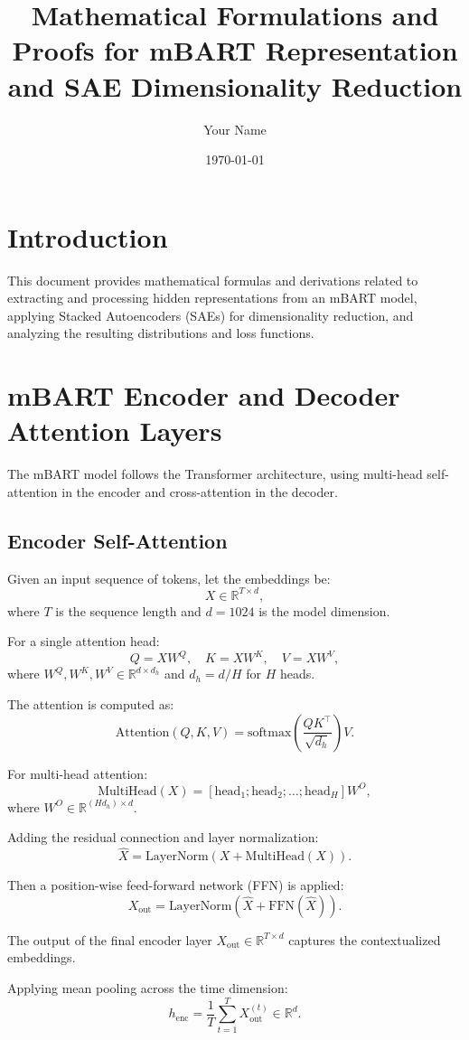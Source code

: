 \documentclass[11pt,a4paper]{article}
\title{Mathematical Formulations and Proofs for mBART Representation and SAE Dimensionality Reduction}
\author{Your Name}
\date{\today}
\begin{document}
\maketitle

\section{Introduction}
This document provides mathematical formulas and derivations related to extracting and processing hidden representations from an mBART model, applying Stacked Autoencoders (SAEs) for dimensionality reduction, and analyzing the resulting distributions and loss functions.

\section{mBART Encoder and Decoder Attention Layers}
The mBART model follows the Transformer architecture, using multi-head self-attention in the encoder and cross-attention in the decoder.

\subsection{Encoder Self-Attention}
Given an input sequence of tokens, let the embeddings be:
\[
X \in \mathbb{R}^{T \times d},
\]
where $T$ is the sequence length and $d=1024$ is the model dimension.

For a single attention head:
\[
Q = X W^Q, \quad K = X W^K, \quad V = X W^V,
\]
where $W^Q, W^K, W^V \in \mathbb{R}^{d \times d_h}$ and $d_h = d/H$ for $H$ heads.

The attention is computed as:
\[
\text{Attention}(Q,K,V) = \text{softmax}\left(\frac{QK^\top}{\sqrt{d_h}}\right) V.
\]

For multi-head attention:
\[
\text{MultiHead}(X) = [\text{head}_1; \text{head}_2; \dots; \text{head}_H] W^O,
\]
where $W^O \in \mathbb{R}^{(H d_h) \times d}$.

Adding the residual connection and layer normalization:
\[
\hat{X} = \text{LayerNorm}(X + \text{MultiHead}(X)).
\]

Then a position-wise feed-forward network (FFN) is applied:
\[
X_{\text{out}} = \text{LayerNorm}(\hat{X} + \text{FFN}(\hat{X})).
\]

The output of the final encoder layer $X_{\text{out}} \in \mathbb{R}^{T \times d}$ captures the contextualized embeddings.

Applying mean pooling across the time dimension:
\[
h_{\text{enc}} = \frac{1}{T}\sum_{t=1}^T X_{\text{out}}^{(t)} \in \mathbb{R}^{d}.
\]
\end{document}

